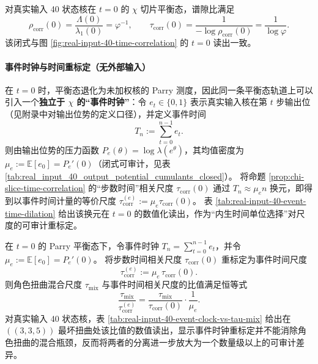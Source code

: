 

\begin{remark}\label{cor:chi-slice-t0-golden-tau}
对真实输入 40 状态核在 $t=0$ 的 $\chi$ 切片平衡态，谱隙比满足
\[
\rho_{\mathrm{corr}}(0)=\frac{\Lambda(0)}{\lambda_1(0)}=\varphi^{-1},
\qquad
\tau_{\mathrm{corr}}(0)=\frac{1}{-\log\rho_{\mathrm{corr}}(0)}=\frac{1}{\log\varphi}.
\]
该闭式与图 \ref{fig:real-input-40-time-correlation} 的 $t=0$ 读出一致。
\end{remark}

\paragraph{事件时钟与时间重标定（无外部输入）}
在 $t=0$ 时，平衡态退化为未加权核的 Parry 测度，因此同一条平衡态轨道上可以引入一个\textbf{独立于 $\chi$ 的“事件时钟”}：令 $e_t\in\{0,1\}$ 表示真实输入核在第 $t$ 步输出位（见附录中对输出位势的定义口径），并定义事件时间
\[
T_n:=\sum_{t=0}^{n-1} e_t.
\]
则由输出位势的压力函数 $P_e(\theta)=\log\lambda(e^{\theta})$，其均值密度为 $\mu_e:=\mathbb{E}[e_0]=P_e'(0)$（闭式可审计，见表 \ref{tab:real_input_40_output_potential_cumulants_closed}）。
将命题 \ref{prop:chi-slice-time-correlation} 的“步数时间”相关尺度 $\tau_{\mathrm{corr}}(0)$ 通过 $T_n\approx \mu_e n$ 换元，即得到以事件时间计量的等价尺度 $\tau_{\mathrm{corr}}^{(e)}:=\mu_e\tau_{\mathrm{corr}}(0)$。
表 \ref{tab:real-input-40-event-time-dilation} 给出该换元在 $t=0$ 的数值化读出，作为“内生时间单位选择”对尺度的可审计重标定。



\begin{remark}\label{cor:chi-event-clock-amplifies-separation}
在 $t=0$ 的 Parry 平衡态下，令事件时钟 $T_n=\sum_{t=0}^{n-1}e_t$，并令 $\mu_e:=\mathbb{E}[e_0]=P_e'(0)$。
将步数时间相关尺度 $\tau_{\mathrm{corr}}(0)$ 重标定为事件时间尺度
\[
\tau_{\mathrm{corr}}^{(e)}:=\mu_e\,\tau_{\mathrm{corr}}(0).
\]
则角色扭曲混合尺度 $\tau_{\mathrm{mix}}$ 与事件时间相关尺度的比值满足恒等式
\[
\frac{\tau_{\mathrm{mix}}}{\tau_{\mathrm{corr}}^{(e)}}
=\frac{\tau_{\mathrm{mix}}}{\tau_{\mathrm{corr}}(0)}\cdot\frac{1}{\mu_e}.
\]
对真实输入 40 状态核，表 \ref{tab:real-input-40-event-clock-vs-tau-mix} 给出在 $((3,3,5))$ 最坏扭曲处该比值的数值读出，显示事件时钟重标定并不能消除角色扭曲的混合瓶颈，反而将两者的分离进一步放大为一个数量级以上的可审计差异。
\end{remark}

